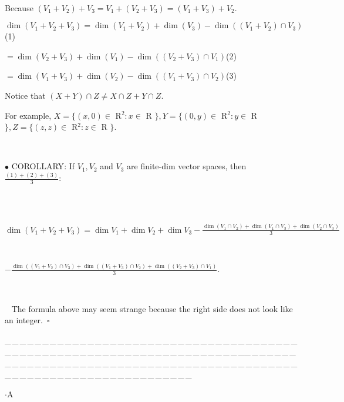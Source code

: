 \documentclass[a4paper, 11pt, UTF8]{article}
\begin{document}
\begin{large}
{\,}\par\quad
Because $(V_1+V_2)+V_3=V_1+(V_2+V_3)=(V_1+V_3)+V_2$.\par\quad
$\dim(V_1+V_2+V_3)=\dim(V_1+V_2)+\dim(V_3)-\dim((V_1+V_2)\cap V_3)$\quad(1)\par\qquad\qquad\qquad\qquad\quad
$=\dim(V_2+V_3)+\dim(V_1)-\dim((V_2+V_3)\cap V_1)$\quad(2)\par\qquad\qquad\qquad\qquad\quad
$=\dim(V_1+V_3)+\dim(V_2)-\dim((V_1+V_3)\cap V_2)$\quad(3)\par\quad
Notice that $(X+Y)\cap Z\neq X\cap Z+Y\cap Z$.\par\qquad For example, $X=\{(x,0)\in$ {\timesbf R}$^2:x\in$ {\timesbf R} $\},Y=\{(0,y)\in$ {\timesbf R}$^2:y\in$ {\timesbf R} $\},Z=\{(z,z)\in$ {\timesbf R}$^2:z\in$ {\timesbf R} $\}$.\par
{\,}\par
{\small$\bullet$} {\timesbf\normalsize C{\footnotesize OROLLARY}:} {\timessl\Large If $V_1,V_2$ and $V_3$ are finite-dim vector spaces, then} {\small $\displaystyle\frac{(1)+(2)+(3)}{3}:$
}\par{\,}\par\,\,
$\dim(V_1+V_2+V_3)=\dim V_1+\dim V_2+\dim V_3-\displaystyle\frac{\dim(V_1\cap V_2)+\dim(V_1\cap V_3)+\dim(V_2\cap V_3)}{3}$\par{\,}\par\qquad\qquad\qquad\qquad\qquad
$-\displaystyle\frac{\dim((V_1+V_2)\cap V_3)+\dim((V_1+V_3)\cap V_2)+\dim((V_2+V_3)\cap V_1)}{3}$.\par{\,}\par\,\,\,
{\timessl The formula above may seem strange because the right side does not look like an integer.$\,\,\,\square$}\par
\par
{\tiny \_\,\_\,\_\,\_\,\_\,\_\,\_\,\_\,\_\,\_\,\_\,\_\,\_\,\_\,\_\,\_\,\_\,\_\,\_\,\_\,\_\,\_\,\_\,\_\,\_\,\_\,\_\,\_\,\_\,\_\,\_\,\_\,\_\,\_\,\_\,\_\,\_\,\_\,\_\,\_\,\_\,\_\,\_\,\_\,\_\,\_\,\_\,\_\,\_\,\_\,\_\,\_\,\_\,\_\,\_\,\_\,\_\,\_\,\_\,\_\,\_\,\_\,\_\,\_\,\_\,\_\,\_\,\_\,\_\,\_\,\_\_\,\_\,\_\,\_\,\_\,\_\,\_\,\_\,\_\,\_\,\_\,\_\,\_\,\_\,\_\,\_\,\_\,\_\,\_\,\_\,\_\,\_\,\_\,\_\,\_\,\_\,\_\,\_\,\_\,\_\,\_\,\_\,\_\,\_\,\_\,\_\,\_\,\_\,\_\,\_\,\_\,\_\,\_\,\_\,\_\,\_\,\_\,\_\,\_\,\_\,\_\,\_\,\_\,\_\,\_\,\_\,\_\,\_\,\_\,\_\,\_\,\_\,\_\,\_\,\_\,\_\,\_\,\_\,\_\,\_\,\_}\par
{}\par

{\huge{}$\cdot$A} %


\end{large}
\end{document}
